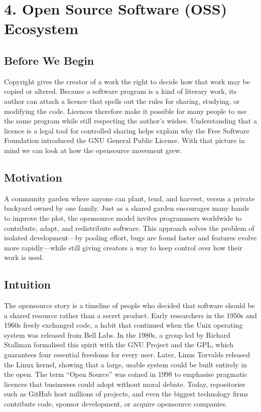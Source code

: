 \documentclass[12pt, a4paper]{article}
\begin{document}
\section{4. Open Source Software (OSS) Ecosystem}

\subsection{Before We Begin}
Copyright gives the creator of a work the right to decide how that work may be copied or altered.  Because a software program is a kind of literary work, its author can attach a licence that spells out the rules for sharing, studying, or modifying the code.  Licences therefore make it possible for many people to use the same program while still respecting the author's wishes.  Understanding that a licence is a legal tool for controlled sharing helps explain why the Free Software Foundation introduced the GNU General Public License.  With that picture in mind we can look at how the opensource movement grew.

\subsection{Motivation}
A community garden where anyone can plant, tend, and harvest, versus a private backyard owned by one family.  Just as a shared garden encourages many hands to improve the plot, the opensource model invites programmers worldwide to contribute, adapt, and redistribute software.  This approach solves the problem of isolated development---by pooling effort, bugs are found faster and features evolve more rapidly---while still giving creators a way to keep control over how their work is used.

\subsection{Intuition}
The opensource story is a timeline of people who decided that software should be a shared resource rather than a secret product.  Early researchers in the 1950s and 1960s freely exchanged code, a habit that continued when the Unix operating system was released from Bell Labs.  In the 1980s, a group led by Richard Stallman formalised this spirit with the GNU Project and the GPL, which guarantees four essential freedoms for every user.  Later, Linus Torvalds released the Linux kernel, showing that a large, usable system could be built entirely in the open.  The term ``Open Source'' was coined in 1998 to emphasise pragmatic licences that businesses could adopt without moral debate.  Today, repositories such as GitHub host millions of projects, and even the biggest technology firms contribute code, sponsor development, or acquire opensource companies.
\end{document}
